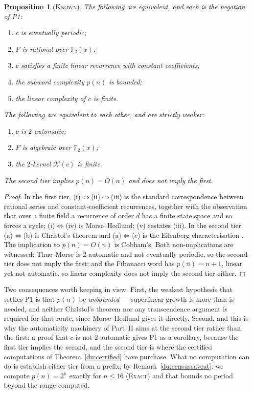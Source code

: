 \documentclass[11pt]{article}
\newtheorem{proposition}[theorem]{Proposition}
\theoremstyle{definition}
\theoremstyle{remark}
\newcommand{\F}{\mathbb{F}_2}
\newcommand{\EXACT}{\textsc{Exact}}
\newcommand{\KNOWN}{\textsc{Known}}
\begin{document}
\begin{proposition}[\KNOWN]\label{pr:tiers}
The following are equivalent, and each is the negation of \textup{P1}:
\begin{enumerate}[nosep,label=\textup{(\roman*)}]
\item $c$ is eventually periodic;
\item $F$ is \emph{rational} over $\F(x)$;
\item $c$ satisfies a finite linear recurrence with constant coefficients;
\item the subword complexity $p(n)$ is \emph{bounded};
\item the linear complexity of $c$ is finite.
\end{enumerate}
The following are equivalent to each other, and are strictly weaker:
\begin{enumerate}[nosep,label=\textup{(\alph*)}]
\item $c$ is $2$-automatic;
\item $F$ is \emph{algebraic} over $\F(x)$;
\item the $2$-kernel $\mathcal K(c)$ is finite.
\end{enumerate}
The second tier implies $p(n)=O(n)$ and does not imply the first.
\end{proposition}
\begin{proof}
In the first tier, (i)$\Leftrightarrow$(ii)$\Leftrightarrow$(iii) is the standard correspondence between
rational series and constant-coefficient recurrences, together with the observation that over a finite
field a recurrence of order $d$ has a finite state space and so forces a cycle; (i)$\Leftrightarrow$(iv)
is Morse--Hedlund; (v) restates (iii). In the second tier (a)$\Leftrightarrow$(b) is Christol's theorem
\cite{CKMFR} and (a)$\Leftrightarrow$(c) is the Eilenberg characterisation \cite{AS}. The implication to
$p(n)=O(n)$ is Cobham's. Both non-implications are witnessed: Thue--Morse is $2$-automatic and not
eventually periodic, so the second tier does not imply the first; and the Fibonacci word has
$p(n)=n+1$, linear yet not automatic, so linear complexity does not imply the second tier either.
\end{proof}

Two consequences worth keeping in view. First, the weakest hypothesis that settles \textup{P1} is that
$p(n)$ be \emph{unbounded} --- superlinear growth is more than is needed, and neither Christol's theorem
nor any transcendence argument is required for that route, since Morse--Hedlund gives it directly.
Second, and this is why the automaticity machinery of Part~II aims at the second tier rather than the
first: a proof that $c$ is not $2$-automatic gives \textup{P1} as a corollary, because the first tier
implies the second, and the second tier is where the certified computations of
Theorem~\ref{du:certified} have purchase. What no computation can do is establish either tier from a
prefix, by Remark~\ref{du:censuscaveat}: we compute $p(n)=2^n$ exactly for $n\le16$ (\EXACT) and that bounds no
period beyond the range computed.
\end{document}
